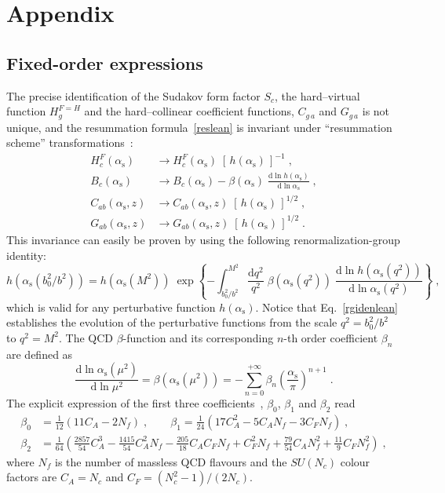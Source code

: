 \documentclass[12pt]{article}
\DeclareRobustCommand{\nn}{\nonumber}
\DeclareRobustCommand{\alphas}{\ensuremath{\alpha_{\mathrm{s}}}\xspace}
\DeclareRobustCommand{\as}{\alphas}
\DeclareRobustCommand{\rd}{\ensuremath{\mathrm{d}}}
\begin{document}
\newpage
\section*{Appendix}
\begin{appendix}

\section{Fixed-order expressions}
\label{app:fixed-order}

The precise identification of the Sudakov form factor $S_c$, the hard--virtual function 
$H_g^{F=H}$ and the hard--collinear coefficient functions, $C_{g\, a}$ and $G_{g\, a}$ is not unique, and the resummation formula~\eqref{reslean} is invariant under ``resummation scheme''  transformations~\cite{Catani:2000vq}:
\begin{align}
  H_c^{F}(\as) &\to
  H_c^{F}(\as) \; \left[ \, h(\as) \, \right]^{-1} \;,
  \nn\\
  B_c(\as) &\to 
  B_c(\as) - \beta(\as) \;\frac{\rd\ln h(\as)}{\rd\ln \as} \;,
  \nn\\
  C_{ab}(\as,z) &\to
  C_{ab}(\as,z) \; \left[ \, h(\as) \, \right]^{1/2} \;,
  \nn\\
  G_{ab}(\as,z) &\to
  G_{ab}(\as,z) \;\left[ \, h(\as) \, \right]^{1/2} \;. 
  \label{restranf}
\end{align}
This invariance can easily be proven by using the following renormalization-group identity:
\begin{equation}
  h(\as(b_0^2/b^2)) = 
  h(\as(M^2)) \; \exp \left\{ 
    -\int_{b_0^2/b^2}^{M^2} \frac{\rd q^2}{q^2} 
    \;\beta(\as(q^2)) \;\frac{\rd \ln h(\as(q^2))}{\rd \ln \as(q^2)} 
  \right\} \;,
  \label{rgidenlean}
\end{equation}
which is valid for any perturbative function $h(\as)$. Notice that Eq.~\eqref{rgidenlean} establishes the evolution of the perturbative functions from the scale $q^{2}=b_0^2/b^2$ to $q^{2}=M^2$. The QCD $\beta$-function and its corresponding $n$-th order coefficient $\beta_n$ are defined as
\begin{equation}
  \frac{\rd \ln \as(\mu^2)}{\rd \ln \mu^2} = 
  \beta(\as(\mu^2)) = 
  - \sum_{n=0}^{+\infty} \beta_n \left( \frac{\as}{\pi} \right)^{n+1} \;.
  \label{rge}
\end{equation}
The explicit expression of the first three coefficients~\cite{Tarasov:1980au,Larin:1993tp}, $\beta_0$, $\beta_1$ and $\beta_2$ read
\begin{align}
  \beta_0 &= 
  \frac{1}{12} \left( 11 C_A - 2 N_f \right) \;,
  \qquad 
  \beta_1 =  
  \frac{1}{24} \left( 17 C_A^2 - 5 C_A N_f - 3 C_F N_f \right) \;,
  \nn\\
  \beta_2 &= 
  \frac{1}{64} \left( \frac{2857}{54} C_A^3
  - \frac{1415}{54} C_A^2 N_f - \frac{205}{18} C_A C_F N_f + C_F^2 N_f
  + \frac{79}{54} C_A N_f^2 + \frac{11}{9} C_F N_f^2 \right) \;,
\end{align}
where $N_f$ is the number of massless QCD flavours and the $SU(N_c)$ colour factors are $C_A=N_c$  and $C_F=(N_c^2-1)/(2N_c)$.


\end{appendix}
\end{document}

